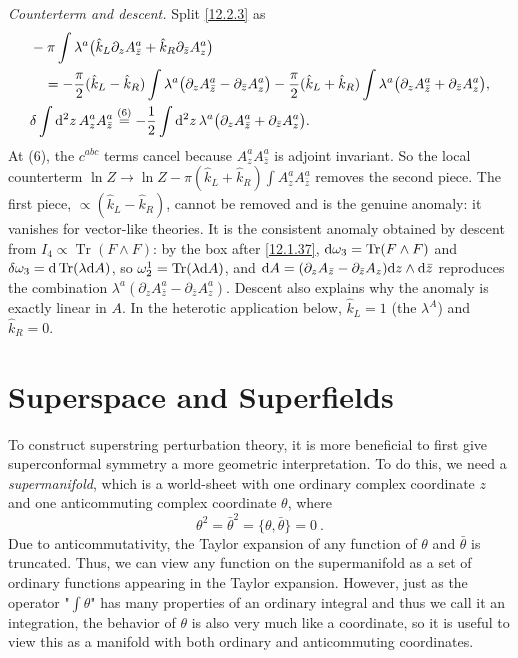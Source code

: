 \begin{tcolorbox}[breakable]
\begin{remark}
		\emph{Counterterm and descent.} Split \eqref{12.2.3} as
		\begin{align*}
			&-\pi\int\lambda^{a}\bigl(\hat k_{L}\partial_{z}A^{a}_{\bar z}+\hat k_{R}\partial_{\bar z}A^{a}_{z}\bigr)\\
			&\quad=-\frac{\pi}{2}(\hat k_{L}-\hat k_{R})\int\lambda^{a}\bigl(\partial_{z}A^{a}_{\bar z}-\partial_{\bar z}A^{a}_{z}\bigr)
			-\frac{\pi}{2}(\hat k_{L}+\hat k_{R})\int\lambda^{a}\bigl(\partial_{z}A^{a}_{\bar z}+\partial_{\bar z}A^{a}_{z}\bigr),\\
			&\delta\int\mathrm{d}^{2}z\,A^{a}_{z}A^{a}_{\bar z}\overset{(6)}{=} -\frac12\int\mathrm{d}^{2}z\,\lambda^{a}\bigl(\partial_{z}A^{a}_{\bar z}+\partial_{\bar z}A^{a}_{z}\bigr) .
		\end{align*}
		At (6), the $c^{abc}$ terms cancel because $A^{a}_{z}A^{a}_{\bar z}$ is adjoint invariant. So the local counterterm $\ln Z\to\ln Z-\pi(\hat k_{L}+\hat k_{R})\int A^{a}_{z}A^{a}_{\bar z}$ removes the second piece. The first piece, $\propto(\hat k_{L}-\hat k_{R})$, cannot be removed and is the genuine anomaly: it vanishes for vector-like theories. It is the consistent anomaly obtained by descent from $I_{4}\propto\operatorname{Tr}(F\wedge F)$: by the box after \eqref{12.1.37}, $\mathrm{d}\omega_{3}=\operatorname{Tr}(F\wedge F)$ and $\delta\omega_{3}=\mathrm{d}\operatorname{Tr}(\lambda\mathrm{d} A)$, so $\omega^{1}_{2}=\operatorname{Tr}(\lambda\mathrm{d} A)$, and $\mathrm{d} A=(\partial_{z}A_{\bar z}-\partial_{\bar z}A_{z})\mathrm{d} z\wedge\mathrm{d}\bar z$ reproduces the combination $\lambda^{a}(\partial_{z}A^{a}_{\bar z}-\partial_{\bar z}A^{a}_{z})$. Descent also explains why the anomaly is exactly linear in $A$. In the heterotic application below, $\hat k_{L}=1$ (the $\lambda^{A}$) and $\hat k_{R}=0$.
	\end{remark}
\end{tcolorbox}

\section{Superspace and Superfields}

To construct superstring perturbation theory, it is more beneficial to first give superconformal symmetry a more geometric interpretation. To do this, we need a \textit{supermanifold}, which is a world-sheet with one ordinary complex coordinate $z$ and one anticommuting complex coordinate $\theta$, where
\begin{equation}
	\theta^{2}=\bar{\theta}^{2} = \{\theta,\bar{\theta}\} = 0 \:. \label{12.3.1}
\end{equation}
Due to anticommutativity, the Taylor expansion of any function of $\theta$ and $\bar{\theta}$ is truncated. Thus, we can view any function on the supermanifold as a set of ordinary functions appearing in the Taylor expansion. However, just as the operator "$\int\theta$" has many properties of an ordinary integral and thus we call it an integration, the behavior of $\theta$ is also very much like a coordinate, so it is useful to view this as a manifold with both ordinary and anticommuting coordinates.

